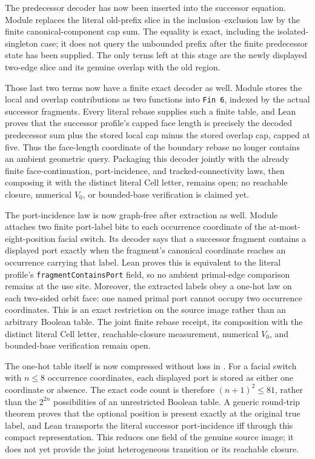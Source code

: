 \documentclass[11pt]{article}
\theoremstyle{definition}
\begin{document}
The predecessor decoder has now been inserted into the successor equation.
Module
replaces the literal old-prefix slice in the inclusion--exclusion law by the
finite canonical-component cap sum.  The equality is exact, including the
isolated-singleton case; it does not query the unbounded prefix after the
finite predecessor state has been supplied.  The only terms left at this
stage are the newly displayed two-edge slice and its genuine overlap with the
old region.

Those last two terms now have a finite exact decoder as well.  Module
stores the local and overlap contributions as two functions into
\texttt{Fin 6}, indexed by the actual successor fragments.  Every literal
rebase supplies such a finite table, and Lean proves that the successor
profile's capped face length is precisely the decoded predecessor sum plus
the stored local cap minus the stored overlap cap, capped at five.  Thus the
face-length coordinate of the boundary rebase no longer contains an ambient
geometric query.  Packaging this decoder jointly with the already finite
face-continuation, port-incidence, and tracked-connectivity laws, then
composing it with the distinct literal Cell letter, remains open; no reachable
closure, numerical $V_0$, or bounded-base verification is claimed yet.

The port-incidence law is now graph-free after extraction as well.  Module
attaches two finite port-label bits to each occurrence coordinate of the
at-most-eight-position facial switch.  Its decoder says that a successor
fragment contains a displayed port exactly when the fragment's canonical
coordinate reaches an occurrence carrying that label.  Lean proves this is
equivalent to the literal profile's \texttt{fragmentContainsPort} field, so no
ambient primal-edge comparison remains at the use site.  Moreover, the
extracted labels obey a one-hot law on each two-sided orbit face: one named
primal port cannot occupy two occurrence coordinates.  This is an exact
restriction on the source image rather than an arbitrary Boolean table.  The
joint finite rebase receipt, its composition with the distinct literal Cell
letter, reachable-closure measurement, numerical $V_0$, and bounded-base
verification remain open.

The one-hot table itself is now compressed without loss in
.
For a facial switch with $n\leq 8$ occurrence coordinates, each displayed
port is stored as either one coordinate or absence.  The exact code count is
therefore $(n+1)^2\leq 81$, rather than the $2^{2n}$ possibilities of an
unrestricted Boolean table.  A generic round-trip theorem proves that the
optional position is present exactly at the original true label, and Lean
transports the literal successor port-incidence iff through this compact
representation.  This reduces one field of the genuine source image; it does
not yet provide the joint heterogeneous transition or its reachable closure.
\end{document}

